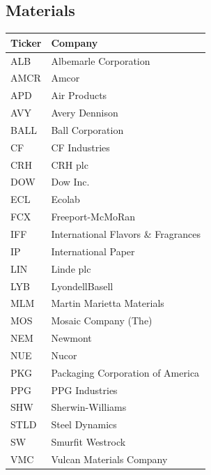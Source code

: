 \documentclass[11pt,a4paper]{article}
\begin{document}
\subsection{Materials}
\begin{table}[H]
\centering
\small
\begin{tabular}{lp{11cm}}
\hline
Ticker & Company \\
\hline
ALB & Albemarle Corporation \\
AMCR & Amcor \\
APD & Air Products \\
AVY & Avery Dennison \\
BALL & Ball Corporation \\
CF & CF Industries \\
CRH & CRH plc \\
DOW & Dow Inc. \\
ECL & Ecolab \\
FCX & Freeport-McMoRan \\
IFF & International Flavors \& Fragrances \\
IP & International Paper \\
LIN & Linde plc \\
LYB & LyondellBasell \\
MLM & Martin Marietta Materials \\
MOS & Mosaic Company (The) \\
NEM & Newmont \\
NUE & Nucor \\
PKG & Packaging Corporation of America \\
PPG & PPG Industries \\
SHW & Sherwin-Williams \\
STLD & Steel Dynamics \\
SW & Smurfit Westrock \\
VMC & Vulcan Materials Company \\
\hline
\end{tabular}
\end{table}
\end{document}
